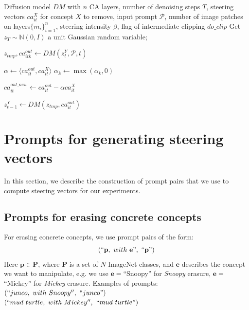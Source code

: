 \begin{algorithm}[h!]
\caption{Using steering vectors}\label{alg:cap_2}
\begin{algorithmic}
\Require Diffusion model $DM$ with $n$ CA layers, number of denoising steps $T$, steering vectors $ca^{X}_{it}$ for concept $X$ to remove, input prompt $\mathcal{P}$,
number of image patches on layers$\{m_i\}_{i=1}^n$, steering intensity $\beta$, flag of intermediate clipping $do\_clip$ 
\State Get $z_T \sim \mathbb{N}(0,I)$ a unit Gaussian random variable;
        
        \State $z_{tmp}, ca^{out}_{itk} \leftarrow DM(z^{Y}_t, \mathcal{P}, t)$ 

        \State $\alpha \leftarrow \langle ca^{out}_{it}, ca^{X}_{it} \rangle$
             
                \State $\alpha_{k} \leftarrow \max(\alpha_{k}, 0)$
            \EndFor
        \EndIf
            
        \State $ca^{out\_new}_{it} \leftarrow ca^{out}_{it}-  \alpha ca^{X}_{it}$ 
        

        \State $z^{Y}_{t-1} \leftarrow DM(z_{tmp}, ca^{out}_{it})$ 
        
    \EndFor
\EndFor
\end{algorithmic}
\label{alg:2}
\end{algorithm}

\clearpage

\section{Prompts for generating steering vectors}
\label{sec:prompts}

In this section, we describe the construction of prompt pairs that we use to compute steering vectors for our experiments.

\subsection{Prompts for erasing concrete concepts}
\label{sec:prompts_erasure}
For erasing concrete concepts, we use prompt pairs of the form: 
$$(``\mathbf{p},\ with\ \mathbf{e}", \  ``\mathbf{p}")$$
\noindent Here $\mathbf{p} \in \mathbf{P}$, where $\mathbf{P}$ is a set of $N$ ImageNet classes, and $\mathbf{e}$ describes the concept we want to manipulate, e.g. we use  $\mathbf{e} =$``Snoopy'' for \textit{Snoopy} erasure, $\mathbf{e} =$``Mickey'' for \textit{Mickey} erasure.
\noindent Examples of prompts: \\
$(``junco,\ with\ Snoopy'', \  ``junco")$\\
$(``mud\ turtle,\ with\ Mickey'',$ $``mud\ turtle")$ 

